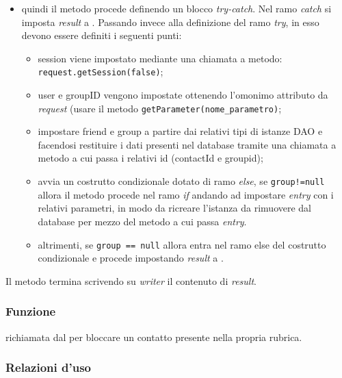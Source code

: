 \begin{description}
\begin{itemize}
		\item quindi il metodo procede definendo un blocco \textit{try-catch}. Nel ramo \textit{catch} si imposta \textit{result} a . Passando invece alla definizione del ramo \textit{try}, in esso devono essere definiti i seguenti punti:
		\begin{itemize}
			\item session viene impostato mediante una chiamata a metodo:
			\verb|request.getSession(false)|;
			\item user e groupID vengono impostate ottenendo l'omonimo attributo da \textit{request} (usare il metodo \texttt{getParameter(nome\_parametro)};
			\item impostare friend e group a partire dai relativi tipi di istanze DAO e facendosi restituire i dati presenti nel database tramite una chiamata a metodo  a cui passa i relativi id (contactId e groupid);
			\item avvia un costrutto condizionale dotato di ramo \textit{else}, se \texttt{group!=null} allora il metodo procede nel ramo \textit{if} andando ad impostare \textit{entry} con i relativi parametri, in modo da ricreare l'istanza  da rimuovere dal database per mezzo del metodo  a cui passa \textit{entry}. 
			\item altrimenti, se \texttt{group == null} allora entra nel ramo else del costrutto condizionale e procede impostando \textit{result} a .
		\end{itemize}
	\end{itemize}
	Il metodo termina scrivendo su \textit{writer} il contenuto di \textit{result}.
	
\end{description}



\subsubsection*{Funzione}
 richiamata dal  per bloccare un contatto presente nella propria rubrica.

\subsubsection*{Relazioni d'uso}

